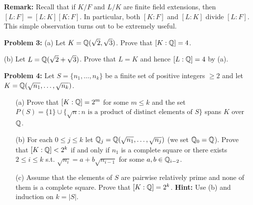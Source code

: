 \documentclass[12pt]{article}
\begin{document}
{\bf Remark:} Recall that if $K/F$ and $L/K$ are finite field extensions,
then $[L:F]=[L:K][K:F]$. In particular, both $[K:F]$ and $[L:K]$ divide $[L:F]$.
This simple observation turns out to be extremely useful.
\skv





{\bf Problem 3:} \rm (a) Let $K={\mathbb Q}(\sqrt{2},\sqrt{3})$. Prove that $[K:{\mathbb Q}]=4$.

(b) Let $L={\mathbb Q}(\sqrt{2}+\sqrt{3})$. Prove that $L=K$ and hence $[L:{\mathbb Q}]=4$ by (a).
\skv

{\bf Problem 4:} \rm Let $S=\{n_1,\ldots, n_k\}$ be a finite set of positive integers $\geq 2$
and let $K={\mathbb Q}(\sqrt{n_1},\ldots, \sqrt{n_k})$.
\begin{itemize}
\item[(a)] Prove that $[K:{\mathbb Q}]=2^m$ for some $m\leq k$ and the set $P(S)=\{1\}\cup \{\sqrt{n} : n \mbox{ is a product of distinct elements of }S\}$ spans $K$ over ${\mathbb Q}$.

\item[(b)] For each $0\leq j\leq k$ let ${\mathbb Q}_j={\mathbb Q}(\sqrt{n_1},\ldots, \sqrt{n_j})$ (we set ${\mathbb Q}_0={\mathbb Q}$).
Prove that $[K:{\mathbb Q}]<2^k$ if and only if $n_1$ is a complete square or
there exists $2\leq i\leq k$ s.t. $\sqrt{n_i}=a+b\sqrt{n_{i-1}}$ for some $a,b\in{\mathbb Q}_{i-2}$.

\item[(c)] Assume that the elements of $S$ are pairwise relatively prime
and none of them is a complete square.
Prove that $[K:{\mathbb Q}]=2^k$. {\bf Hint:} Use (b) and induction on $k=|S|$.
\end{itemize}
\end{document}
